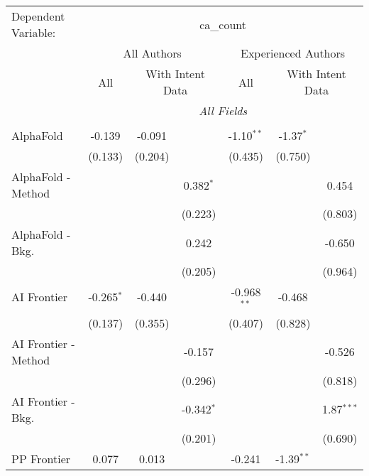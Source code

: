 \begingroup
\centering
\begin{tabular}{lcccccc}
   \tabularnewline \midrule \midrule
   Dependent Variable: & \multicolumn{6}{c}{ca\_count}\\
 & \multicolumn{3}{c}{All Authors} & \multicolumn{3}{c}{Experienced Authors} \\
\cmidrule(lr){2-4} \cmidrule(lr){5-7}
 & \multicolumn{1}{c}{All} & \multicolumn{2}{c}{With Intent Data} & \multicolumn{1}{c}{All} & \multicolumn{2}{c}{With Intent Data} \\
\cmidrule(lr){2-2} \cmidrule(lr){3-4} \cmidrule(lr){5-5} \cmidrule(lr){6-7}
 & \multicolumn{6}{c}{\textit{All Fields}} \\ \\
   AlphaFold            & -0.139       & -0.091  &                & -1.10$^{**}$   & -1.37$^{*}$  &   \\   
                        & (0.133)      & (0.204) &                & (0.435)        & (0.750)      &   \\   
   AlphaFold - Method   &              &         & 0.382$^{*}$    &                &              & 0.454\\   
                        &              &         & (0.223)        &                &              & (0.803)\\   
   AlphaFold - Bkg.     &              &         & 0.242          &                &              & -0.650\\   
                        &              &         & (0.205)        &                &              & (0.964)\\   
   AI Frontier          & -0.265$^{*}$ & -0.440  &                & -0.968$^{**}$  & -0.468       &   \\   
                        & (0.137)      & (0.355) &                & (0.407)        & (0.828)      &   \\   
   AI Frontier - Method &              &         & -0.157         &                &              & -0.526\\   
                        &              &         & (0.296)        &                &              & (0.818)\\   
   AI Frontier - Bkg.   &              &         & -0.342$^{*}$   &                &              & 1.87$^{***}$\\   
                        &              &         & (0.201)        &                &              & (0.690)\\   
   PP Frontier          & 0.077        & 0.013   &                & -0.241         & -1.39$^{**}$ &   \\   

\end{tabular}
